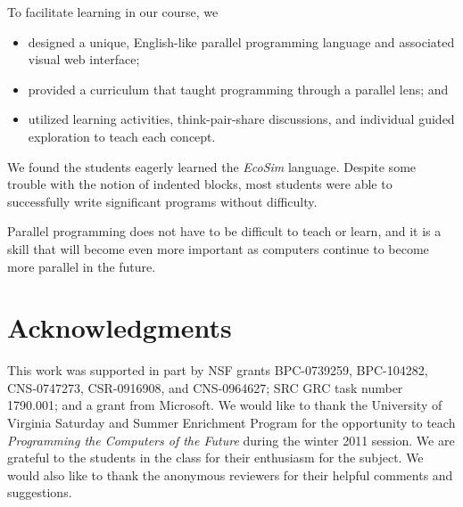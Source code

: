 \documentclass{sig-alternate}
\newcommand{\EcoSim}{\emph{EcoSim}}
\begin{document}
To facilitate learning in our course, we
\begin{itemize}\itemsep=0pt\parskip=0pt
\item designed a unique, English-like parallel programming language and associated visual web interface;
\item provided a curriculum that taught programming through a parallel lens; and
\item utilized learning activities, think-pair-share discussions, and individual guided exploration to teach each concept.
\end{itemize}
We found the students eagerly learned the \EcoSim{} language.
Despite some trouble with the notion of indented blocks,
most students were able to successfully write significant programs without difficulty.  


Parallel programming does not have to be difficult to teach or learn,
and it is a skill that will become even more important as computers continue to become more
parallel in the future.


\section*{Acknowledgments}
This work was supported in part by NSF grants BPC-0739259, BPC-104282, CNS-0747273, CSR-0916908, and CNS-0964627; SRC GRC
task number 1790.001; and a grant from Microsoft. We would like to thank 
the University of Virginia Saturday and Summer Enrichment Program for the opportunity to
teach \emph{Programming the Computers of the Future} during the winter 2011 session.
We are grateful to the students in the class for their enthusiasm for the subject.  
We would also like to thank the anonymous reviewers for their helpful comments and suggestions.

%
{\small

}
%
%
\end{document}

